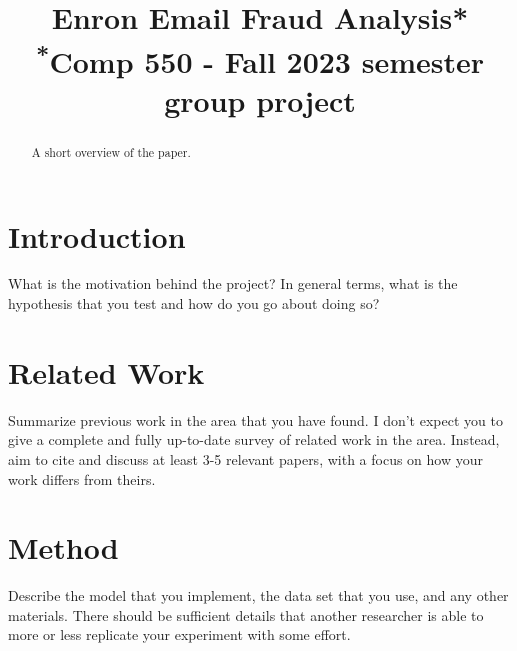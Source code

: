 \documentclass[conference]{IEEEtran}
\begin{document}
\title{Enron Email Fraud Analysis* \\
{\footnotesize \textsuperscript{*}Comp 550 - Fall 2023 semester group project}
}

\author{
\and
{}
\and
{}
}
\maketitle

\begin{abstract}
A short overview of the paper.
\end{abstract}

\section{Introduction}
What is the motivation behind the project? In general terms, what is the hypothesis that you test and how do you go about doing so?

\section{Related Work}
Summarize previous work in the area that you have found. I don't expect you to give a complete and fully up-to-date survey of related work in the area. Instead, aim to cite and discuss at least 3-5 relevant papers, with a focus on how your work differs from theirs.

\section{Method}
Describe the model that you implement, the data set that you use, and any other materials. There should be sufficient details that another researcher is able to more or less replicate your experiment with some effort.
\end{document}
